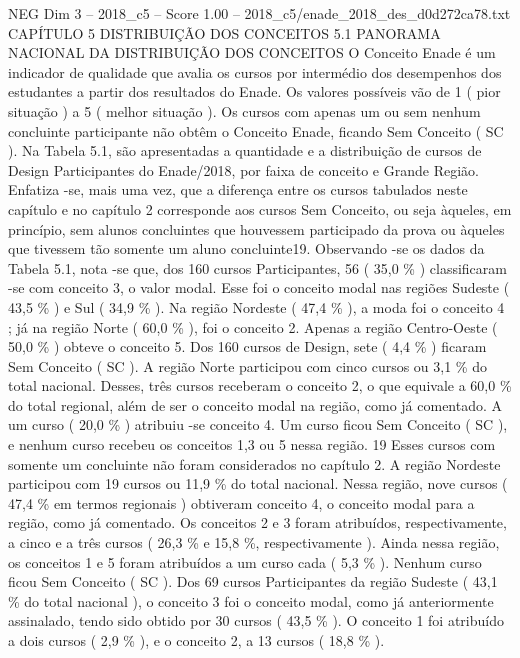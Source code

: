 \begin{textsample}{NEG Dim 3 – 2018\_c5 – Score 1.00 – 2018\_c5/enade\_2018\_des\_d0d272ca78.txt}  \label{ex:f3_neg_102}
CAPÍTULO 5 DISTRIBUIÇÃO DOS CONCEITOS 5.1 PANORAMA NACIONAL DA DISTRIBUIÇÃO DOS CONCEITOS O Conceito Enade é um indicador de qualidade que avalia os cursos por intermédio dos desempenhos dos estudantes a partir dos resultados do Enade.
Os valores possíveis vão de 1 ( pior situação ) a 5 ( melhor situação ).
Os cursos com apenas um ou sem nenhum concluinte participante não obtêm o Conceito Enade, ficando Sem Conceito ( SC ).
Na Tabela 5.1, são apresentadas a quantidade e a distribuição de cursos de Design Participantes do Enade/2018, por faixa de conceito e Grande Região.
Enfatiza -se, mais uma vez, que a diferença entre os cursos tabulados neste capítulo e no capítulo 2 corresponde aos cursos Sem Conceito, ou seja àqueles, em princípio, sem alunos concluintes que houvessem participado da prova ou àqueles que tivessem tão somente um aluno concluinte19.
Observando -se os dados da Tabela 5.1, nota -se que, dos 160 cursos Participantes, 56 ( 35,0 \% ) classificaram -se com conceito 3, o valor modal.
Esse foi o conceito modal nas regiões Sudeste ( 43,5 \% ) e Sul ( 34,9 \% ).
Na região Nordeste ( 47,4 \% ), a moda foi o conceito 4 ; já na região Norte ( 60,0 \% ), foi o conceito 2.
Apenas a região Centro-Oeste ( 50,0 \% ) obteve o conceito 5.
Dos 160 cursos de Design, sete ( 4,4 \% ) ficaram Sem Conceito ( SC ).
A região Norte participou com cinco cursos ou 3,1 \% do total nacional.
Desses, três cursos receberam o conceito 2, o que equivale a 60,0 \% do total regional, além de ser o conceito modal na região, como já comentado.
A um curso ( 20,0 \% ) atribuiu -se conceito 4.
Um curso ficou Sem Conceito ( SC ), e nenhum curso recebeu os conceitos 1,3 ou 5 nessa região. 19 Esses cursos com somente um concluinte não foram considerados no capítulo 2.
A região Nordeste participou com 19 cursos ou 11,9 \% do total nacional.
Nessa região, nove cursos ( 47,4 \% em termos regionais ) obtiveram conceito 4, o conceito modal para a região, como já comentado.
Os conceitos 2 e 3 foram atribuídos, respectivamente, a cinco e a três cursos ( 26,3 \% e 15,8 \%, respectivamente ).
Ainda nessa região, os conceitos 1 e 5 foram atribuídos a um curso cada ( 5,3 \% ).
Nenhum curso ficou Sem Conceito ( SC ).
Dos 69 cursos Participantes da região Sudeste ( 43,1 \% do total nacional ), o conceito 3 foi o conceito modal, como já anteriormente assinalado, tendo sido obtido por 30 cursos ( 43,5 \% ).
O conceito 1 foi atribuído a dois cursos ( 2,9 \% ), e o conceito 2, a 13 cursos ( 18,8 \% ).

\end{textsample}
